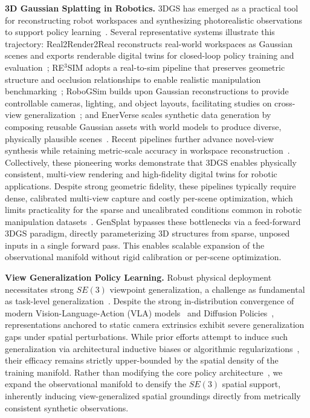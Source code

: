 \noindent \textbf{3D Gaussian Splatting in Robotics.} 
3DGS has emerged as a practical tool for reconstructing robot workspaces and synthesizing photorealistic observations to support policy learning~\cite{yang2025novel,yu2025real2render2real,huang2025enerverse,li2024robogsim,han2025re,torne2024robot}. 
Several representative systems illustrate this trajectory: Real2Render2Real reconstructs real-world workspaces as Gaussian scenes and exports renderable digital twins for closed-loop policy training and evaluation~\cite{yu2025real2render2real}; RE\(^3\)SIM adopts a real-to-sim pipeline that preserves geometric structure and occlusion relationships to enable realistic manipulation benchmarking~\cite{han2025re}; RoboGSim builds upon Gaussian reconstructions to provide controllable cameras, lighting, and object layouts, facilitating studies on cross-view generalization~\cite{li2024robogsim}; and EnerVerse scales synthetic data generation by composing reusable Gaussian assets with world models to produce diverse, physically plausible scenes~\cite{huang2025enerverse}. 
Recent pipelines further advance novel-view synthesis while retaining metric-scale accuracy in workspace reconstruction~\cite{yang2025novel,torne2024robot,pan2025one}. Collectively, these pioneering works demonstrate that 3DGS enables physically consistent, multi-view rendering and high-fidelity digital twins for robotic applications.
Despite strong geometric fidelity, these pipelines typically require dense, calibrated multi-view capture and costly per-scene optimization, which limits practicality for the sparse and uncalibrated conditions common in robotic manipulation datasets~\cite{o2024open,khazatsky2024droid,walke2023bridgedata,dasari2019robonet}.
GenSplat bypasses these bottlenecks via a feed-forward 3DGS paradigm, directly parameterizing 3D structures from sparse, unposed inputs in a single forward pass. This enables scalable expansion of the observational manifold without rigid calibration or per-scene optimization.

\noindent \textbf{View Generalization Policy Learning.} 
Robust physical deployment necessitates strong $SE(3)$ viewpoint generalization, a challenge as fundamental as task-level generalization~\cite{pang2025learning,yang2023movie,chen2024rovi,tian2024view,shi2025nvspolicy}. Despite the strong in-distribution convergence of modern Vision-Language-Action (VLA) models~\cite{black2410pi0,kim2024openvla,zheng2024tracevla,zhao2025cot,zitkovich2023rt} and Diffusion Policies~\cite{chi2023diffusion}, representations anchored to static camera extrinsics exhibit severe generalization gaps under spatial perturbations. While prior efforts attempt to induce such generalization via architectural inductive biases or algorithmic regularizations~\cite{bai2025learning,seo2023multi,goyal2024rvt2,tian2025pdfactor,wang2025flowram,jiang2025you}, their efficacy remains strictly upper-bounded by the spatial density of the training manifold. Rather than modifying the core policy architecture~\cite{abouzeid2025geoaware,zhang2025grounding,li2025spatial,lin2025evo}, we expand the observational manifold to densify the $SE(3)$ spatial support, inherently inducing view-generalized spatial groundings directly from metrically consistent synthetic observations.